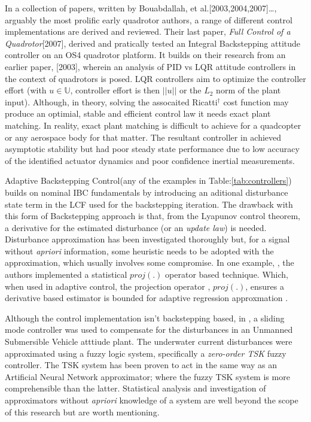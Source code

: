 \par
\vspace{-15pt}
In a collection of papers, written by Bouabdallah, et al.[2003,2004,2007]\ldots , arguably the most prolific early quadrotor authors, a range of different control implementations are derived and reviewed. Their last paper, \emph{Full Control of a Quadrotor}[2007]\cite{fullquadcoptercontrol}, derived and pratically tested an Integral Backstepping attitude controller on an OS4 quadrotor platform. It builds on their research from an earlier paper, [2003]\cite{pidlqr}, wherein an analysis of PID vs LQR attitude controllers in the context of quadrotors is posed. LQR controllers aim to optimize the controller effort (with $u\in\mathbb{U}$, controller effort is then $||u||$ or the $L_2$ norm of the plant input). Although, in theory, solving the assocaited Ricatti$^{\dagger}$ cost function may produce an optimial, stable and efficient control law it needs exact plant matching. In reality, exact plant matching is difficult to achieve for a quadcopter or any aerospace body for that matter. The resultant controller in \cite{pidlqr} achieved asymptotic stability but had poor steady state performance due to low accuracy of the identified actuator dynamics and poor confidence inertial measurements.
\par
Adaptive Backstepping Control\cite{backstepping}(any of the examples in Table:\ref{tab:controllers}) builds on nominal IBC fundamentals by introducing an aditional disturbance state term in the LCF used for the backstepping iteration. The drawback with this form of Backstepping approach is that, from the Lyapunov control theorem, a derivative for the estimated disturbance (or an \emph{update law}) is needed. Disturbance approximation has been investigated thoroughly but, for a signal without \emph{apriori} information, some heuristic needs to be adopted with the approximation, which usually involves some compromise.
\newpage
In one example, \cite{nonlinearadaptive}, the authors implemented a statistical $proj(.)$ operator based technique. Which, when used in adaptive control, the projection operator \cite{outputfeedback}, $proj(.)$, ensures a derivative based estimator is bounded for adaptive regression approxmation \cite{nonlinearregression}.
\par
Although the control implementation isn't backstepping based, in \cite{adaptiveslidingmode}, a sliding mode controller was used to compensate for the disturbances in an Unmanned Submersible Vehicle atttiude plant. The underwater current disturbances were approximated using a fuzzy logic system, specifically a \emph{zero-order TSK} fuzzy controller. The TSK system has been proven to act in the same way as an Artificial Neural Network approximator\cite{zeroTSK}; where the fuzzy TSK system is more comprehensible than the latter. Statistical analysis and investigation of approximators without \emph{apriori} knowledge of a system are well beyond the scope of this research but are worth mentioning.
